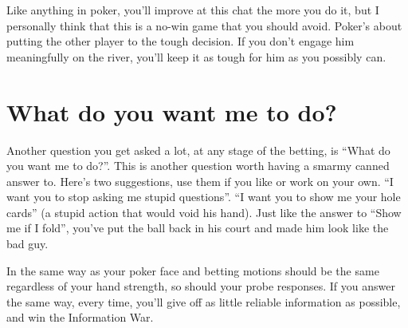 \begin{itemize}
    Like anything in poker, you'll improve at this chat the more you
    do it, but I personally think that this is a no-win game that you
    should avoid. Poker's about putting the other player to the tough
    decision. If you don't engage him meaningfully on the river,
    you'll keep it as tough for him as you possibly can.
    
\end{itemize}

\section{What do you want me to do?}

Another question you get asked a lot, at any stage of the betting, is
``What do you want me to do?''. This is another question worth having
a smarmy canned answer to. Here's two suggestions, use them if you
like or work on your own. ``I want you to stop asking me stupid
questions''. ``I want you to show me your hole cards'' (a stupid
action that would void his hand). Just like the answer to ``Show me if
I fold'', you've put the ball back in his court and made him look like
the bad guy.

In the same way as your poker face and betting motions should be the
same regardless of your hand strength, so should your probe
responses. If you answer the same way, every time, you'll give off
as little reliable information as possible, and win the
Information War.
